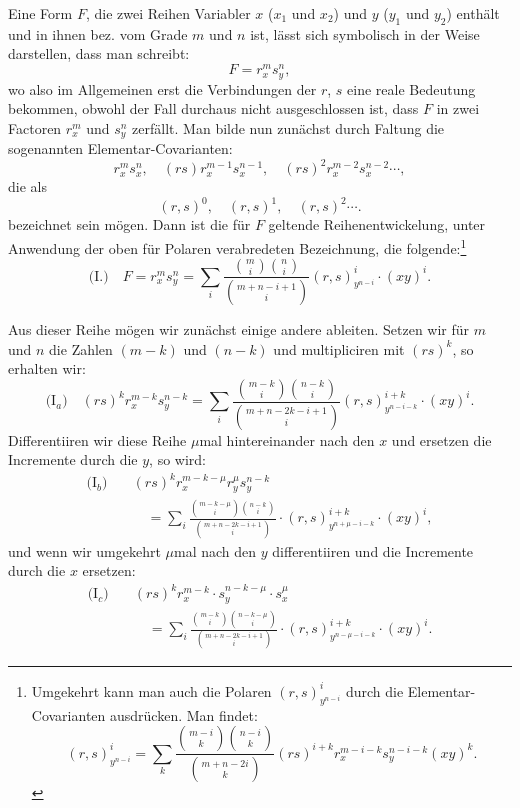 \documentclass[10pt]{article}
\begin{document}
Eine Form $F$, die zwei Reihen Variabler $x$ ($x_1$ und $x_2$) und $y$ ($y_1$ und $y_2$) enthält und in ihnen bez. vom Grade $m$ und $n$ ist, lässt sich symbolisch in der Weise darstellen, dass man schreibt:
\[
F=r_x^m s_y^n,
\]
wo also im Allgemeinen erst die Verbindungen der $r$, $s$ eine reale Bedeutung bekommen, obwohl der Fall durchaus nicht ausgeschlossen ist, dass $F$ in zwei Factoren $r_x^m$ und $s_y^n$ zerfällt. Man bilde nun zunächst durch Faltung die sogenannten Elementar-Covarianten:
\[
r_x^m s_x^n,\quad (rs)r_x^{m-1}s_x^{n-1},\quad (rs)^2 r_x^{m-2}s_x^{n-2}\cdots,
\]
die als
\[
(r,s)^0,\quad (r,s)^1,\quad (r,s)^2\cdots.
\]
bezeichnet sein mögen. Dann ist die für $F$ geltende Reihenentwickelung, unter Anwendung der oben für Polaren verabredeten Bezeichnung, die folgende:\footnote{Umgekehrt kann man auch die Polaren $(r,s)^i_{y^{n-i}}$ durch die Elementar-Covarianten ausdrücken. Man findet:
\[
(r,s)^i_{y^{n-i}}=\sum_k\frac{\binom{m-i}{k}\binom{n-i}{k}}{\binom{m+n-2i}{k}}(rs)^{i+k}r_x^{m-i-k}s_y^{n-i-k}(xy)^k.
\]}
\[
\text{(I.)}\quad F=r_x^m s_y^n=\sum_i\frac{\binom{m}{i}\binom{n}{i}}{\binom{m+n-i+1}{i}}(r,s)^i_{y^{n-i}}\cdot(xy)^i.
\]

Aus dieser Reihe mögen wir zunächst einige andere ableiten. Setzen wir für $m$ und $n$ die Zahlen $(m-k)$ und $(n-k)$ und multipliciren mit $(rs)^k$, so erhalten wir:
\[
\text{(I$_a$)}\quad (rs)^k r_x^{m-k}s_y^{n-k}=\sum_i\frac{\binom{m-k}{i}\binom{n-k}{i}}{\binom{m+n-2k-i+1}{i}}(r,s)^{i+k}_{y^{n-i-k}}\cdot(xy)^i.
\]
Differentiiren wir diese Reihe $\mu$mal hintereinander nach den $x$ und ersetzen die Incremente durch die $y$, so wird:
\[
\begin{aligned}
\text{(I$_b$)}\quad &(rs)^k r_x^{m-k-\mu}r_y^\mu s_y^{n-k} \\
&\quad =\sum_i\frac{\binom{m-k-\mu}{i}\binom{n-k}{i}}{\binom{m+n-2k-i+1}{i}}\cdot (r,s)^{i+k}_{y^{n+\mu-i-k}}\cdot (xy)^i,
\end{aligned}
\]
und wenn wir umgekehrt $\mu$mal nach den $y$ differentiiren und die Incremente durch die $x$ ersetzen:
\[
\begin{aligned}
\text{(I$_c$)}\quad &(rs)^k r_x^{m-k}\cdot s_y^{n-k-\mu}\cdot s_x^\mu \\
&\quad =\sum_i\frac{\binom{m-k}{i}\binom{n-k-\mu}{i}}{\binom{m+n-2k-i+1}{i}}\cdot (r,s)^{i+k}_{y^{n-\mu-i-k}}\cdot (xy)^i.
\end{aligned}
\]
\end{document}
